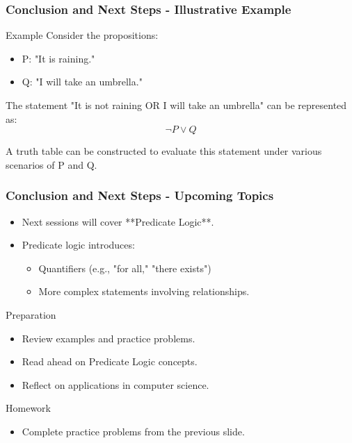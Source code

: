 \documentclass[aspectratio=169]{beamer}
\begin{document}
\begin{frame}[fragile]
  \frametitle{Conclusion and Next Steps - Illustrative Example}
  
  \begin{block}{Example}
    Consider the propositions:
    \begin{itemize}
      \item P: "It is raining."
      \item Q: "I will take an umbrella."
    \end{itemize}
    
    The statement "It is not raining OR I will take an umbrella" can be represented as:
    \begin{equation}
      \neg P \lor Q
    \end{equation}
    
    A truth table can be constructed to evaluate this statement under various scenarios of P and Q.
  \end{block}
\end{frame}

\begin{frame}[fragile]
  \frametitle{Conclusion and Next Steps - Upcoming Topics}
  
  \begin{itemize}
    \item Next sessions will cover **Predicate Logic**.
    \item Predicate logic introduces:
      \begin{itemize}
        \item Quantifiers (e.g., "for all," "there exists")
        \item More complex statements involving relationships.
      \end{itemize}
  \end{itemize}
  
  \begin{block}{Preparation}
    \begin{itemize}
      \item Review examples and practice problems.
      \item Read ahead on Predicate Logic concepts.
      \item Reflect on applications in computer science.
    \end{itemize}
  \end{block}
  
  \begin{block}{Homework}
    \begin{itemize}
      \item Complete practice problems from the previous slide.
    \end{itemize}
  \end{block}
\end{frame}
\end{document}
